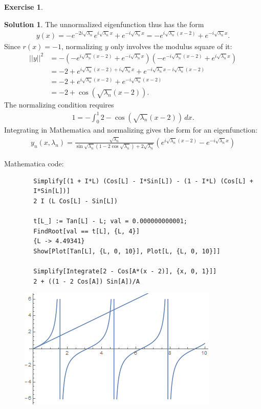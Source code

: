 \documentclass{article}
\theoremstyle{definition}
\newtheorem*{exer*}{Exercise}
\newtheorem*{sln*}{Solution}
\begin{document}
\begin{exer*}
\begin{enumerate}
\begin{sln*}
			The unnormalized eigenfunction thus has the form 
			\begin{align*}
			y(x) = -e^{-2i\sqrt{\lambda_n}}e^{i\sqrt{\lambda_n}x} + e^{-i\sqrt{\lambda_n}x} = -e^{i\sqrt{\lambda_n}(x-2)} + e^{-i\sqrt{\lambda_n}x} .
			\end{align*}	
			Since $r(x) = -1$, normalizing $y$ only involves the modulus square of it:
			\begin{align*}
			\vert\vert y \vert\vert^2 &= -(-e^{i\sqrt{\lambda_n}(x-2)} + e^{-i\sqrt{\lambda_n}x})(-e^{-i\sqrt{\lambda_n}(x-2)} + e^{i\sqrt{\lambda_n}x})\\
			&= -2 + e^{i\sqrt{\lambda_n}(x-2) + i\sqrt{\lambda_n}x} + e^{-i\sqrt{\lambda_n}x  -i\sqrt{\lambda_n}(x-2) }\\
			&= -2 + e^{i\sqrt{\lambda_n}(x-2)} + e^{-i\sqrt{\lambda_n}(x-2)}\\
			&= -2 + \cos\left(\sqrt{\lambda_n} (x-2)\right).
			\end{align*}
			The normalizing condition requires 
			\begin{align*}
			1 = -\int^1_0 2 - \cos\left(\sqrt{\lambda_n} (x-2)\right)\,dx.
			\end{align*}
			Integrating in Mathematica and normalizing gives the form for an eigenfunction:
			\begin{align*}
			\boxed{y_n(x,\lambda_n) =  \frac{\sqrt{\lambda_n}}{\sin\sqrt{\lambda_n} (1- 2 \cos\sqrt{\lambda_n})+2\sqrt{\lambda_n}}\left( e^{i\sqrt{\lambda_n}(x-2)} - e^{-i\sqrt{\lambda_n}x}  \right)}
			\end{align*}
		\end{sln*}
		
		Mathematica code:
		\begin{lstlisting}
		Simplify[(1 + I*L) (Cos[L] - I*Sin[L]) - (1 - I*L) (Cos[L] + 
		I*Sin[L])]
		2 I (L Cos[L] - Sin[L])
		
		t[L_] := Tan[L] - L; val = 0.000000000001; 
		FindRoot[val == t[L], {L, 4}]
		{L -> 4.49341}
		Show[Plot[Tan[L], {L, 0, 10}], Plot[L, {L, 0, 10}]]
		
		Simplify[Integrate[2 - Cos[A*(x - 2)], {x, 0, 1}]]
		2 + ((1 - 2 Cos[A]) Sin[A])/A
		\end{lstlisting}
		
		\begin{figure}[h!]
			\centering
			\includegraphics[scale=0.7]{pde_3_1.png}
		\end{figure}
		

\end{enumerate}
\end{exer*}
\end{document}
